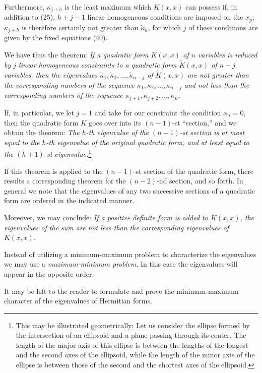 Furthermore, $\kappa_{j+h}$ is the least maximum which $K(x,x)$ can possess if, in addition to (25), $h+j-1$ linear homogeneous conditions are imposed on the $x_p$; $\kappa_{j+h}$ is therefore certainly not greater than $\widetilde\kappa_h$, for which $j$ of these conditions are given by the fixed equations (40).

We have thus the theorem: \emph{If a quadratic form $K(x,x)$ of $n$ variables is reduced by $j$ linear homogeneous constraints to a quadratic form $\widetilde K(x,x)$ of $n-j$ variables, then the eigenvalues $\widetilde\kappa_1,\widetilde\kappa_2,\ldots,\widetilde\kappa_{n-j}$ of $\widetilde K(x,x)$ are not greater than the corresponding numbers of the sequence $\kappa_1,\kappa_2,\ldots,\kappa_{n-j}$ and not less than the corresponding numbers of the sequence $\kappa_{j+1},\kappa_{j+2},\ldots,\kappa_n$.}

If, in particular, we let $j=1$ and take for our constraint the condition $x_n=0$, then the quadratic form $K$ goes over into its $(n-1)$-st ``section,'' and we obtain the theorem: \emph{The $h$-th eigenvalue of the $(n-1)$-st section is at most equal to the $h$-th eigenvalue of the original quadratic form, and at least equal to the $(h+1)$-st eigenvalue.}\footnote{This may be illustrated geometrically: Let us consider the ellipse formed by the intersection of an ellipsoid and a plane passing through its center. The length of the major axis of this ellipse is between the lengths of the longest and the second axes of the ellipsoid, while the length of the minor axis of the ellipse is between those of the second and the shortest axes of the ellipsoid.}

If this theorem is applied to the $(n-1)$-st section of the quadratic form, there results a corresponding theorem for the $(n-2)$-nd section, and so forth. In general we note that the eigenvalues of any two successive sections of a quadratic form are ordered in the indicated manner.

Moreover, we may conclude: \emph{If a positive definite form is added to $K(x,x)$, the eigenvalues of the sum are not less than the corresponding eigenvalues of $K(x,x)$.}

Instead of utilizing a minimum-maximum problem to characterize the eigenvalues we may use a \emph{maximum-minimum problem}. In this case the eigenvalues will appear in the opposite order.

It may be left to the reader to formulate and prove the minimum-maximum character of the eigenvalues of Hermitian forms.

